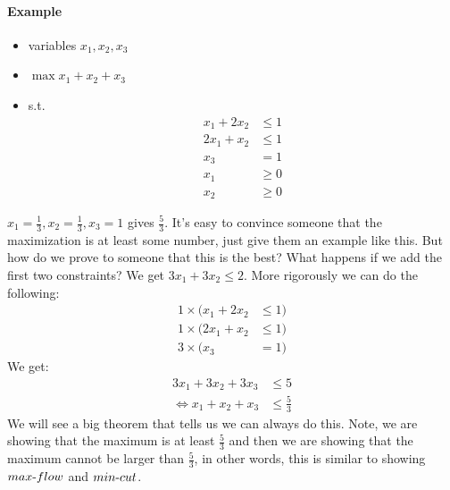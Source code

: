 \documentclass[12 pt]{article}
\begin{document}
        \paragraph{Example}
        \begin{itemize}
        \item variables $x_1, x_2, x_3$
        \item $\max x_1 + x_2 + x_3$
        \item s.t.
          \begin{align*}
            x_1 + 2x_2 & \leq 1
            \\ 2x_1 + x_2 & \leq 1
            \\ x_3 & = 1
            \\ x_1 & \geq 0
            \\ x_2 & \geq 0
          \end{align*}
        \end{itemize}
        $x_1 = \frac{1}{3}, x_2 = \frac{1}{3}, x_3 = 1$ gives
        $\frac{5}{3}$. It's easy to convince someone that the
        maximization is at least some number, just give them an
        example like this. But how do we prove to someone that this is
        the best? What happens if we add the first two constraints? We
        get $3x_1 + 3x_2 \leq 2$. More rigorously we can do the
        following:
        \begin{align*}
          1 \times (x_1 + 2x_2 &\leq 1)
          \\ 1 \times (2x_1 + x_2 &\leq 1)
          \\ 3 \times (x_3 & = 1)
        \end{align*}
        We get: 
        \begin{align*}
          3x_1 + 3x_2 + 3x_3 & \leq 5
          \\ \iff x_1 + x_2 + x_3 & \leq \frac{5}{3}
        \end{align*}
        We will see a big theorem that tells us we can always do
        this. Note, we are showing that the maximum is at least
        $\frac{5}{3}$ and then we are showing that the maximum cannot
        be larger than $\frac{5}{3}$, in other words, this is similar
        to showing $max\hbox{-}flow$ and $min\hbox{-}cut$.
\end{document}
